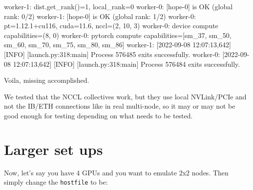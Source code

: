 \documentclass[
]{report}
\newenvironment{Shaded}{\begin{snugshade}}{\end{snugshade}}
\newcommand{\ErrorTok}[1]{\textcolor[rgb]{0.68,0.00,0.00}{#1}}
\newcommand{\ExtensionTok}[1]{\textcolor[rgb]{0.00,0.23,0.31}{#1}}
\newcommand{\KeywordTok}[1]{\textcolor[rgb]{0.00,0.23,0.31}{#1}}
\newcommand{\NormalTok}[1]{\textcolor[rgb]{0.00,0.23,0.31}{#1}}
\newcommand{\PreprocessorTok}[1]{\textcolor[rgb]{0.68,0.00,0.00}{#1}}
\newcommand{\SpecialStringTok}[1]{\textcolor[rgb]{0.13,0.47,0.30}{#1}}
\newcommand{\StringTok}[1]{\textcolor[rgb]{0.13,0.47,0.30}{#1}}
\begin{document}
\begin{Shaded}
\begin{Highlighting}[]
\ExtensionTok{worker{-}1:}\NormalTok{ dist.get\_rank}\ErrorTok{(}\KeywordTok{)}\ExtensionTok{=1,}\NormalTok{ local\_rank=0}
\ExtensionTok{worker{-}0:} \PreprocessorTok{[}\SpecialStringTok{hope}\PreprocessorTok{{-}}\SpecialStringTok{0}\PreprocessorTok{]}\NormalTok{ is OK }\ErrorTok{(}\ExtensionTok{global}\NormalTok{ rank: 0/2}\KeywordTok{)}
\ExtensionTok{worker{-}1:} \PreprocessorTok{[}\SpecialStringTok{hope}\PreprocessorTok{{-}}\SpecialStringTok{0}\PreprocessorTok{]}\NormalTok{ is OK }\ErrorTok{(}\ExtensionTok{global}\NormalTok{ rank: 1/2}\KeywordTok{)}
\ExtensionTok{worker{-}0:}\NormalTok{ pt=1.12.1+cu116, cuda=11.6, nccl=}\ErrorTok{(}\ExtensionTok{2,}\NormalTok{ 10, 3}\KeywordTok{)}
\ExtensionTok{worker{-}0:}\NormalTok{ device compute capabilities=}\ErrorTok{(}\ExtensionTok{8,}\NormalTok{ 0}\KeywordTok{)}
\ExtensionTok{worker{-}0:}\NormalTok{ pytorch compute capabilities=[}\StringTok{\textquotesingle{}sm\_37\textquotesingle{}}\NormalTok{, }\StringTok{\textquotesingle{}sm\_50\textquotesingle{}}\NormalTok{, }\StringTok{\textquotesingle{}sm\_60\textquotesingle{}}\NormalTok{, }\StringTok{\textquotesingle{}sm\_70\textquotesingle{}}\NormalTok{, }\StringTok{\textquotesingle{}sm\_75\textquotesingle{}}\NormalTok{, }\StringTok{\textquotesingle{}sm\_80\textquotesingle{}}\NormalTok{, }\StringTok{\textquotesingle{}sm\_86\textquotesingle{}}\NormalTok{]}
\ExtensionTok{worker{-}1:}\NormalTok{ [2022{-}09{-}08 12:07:13,642] }\PreprocessorTok{[}\SpecialStringTok{INFO}\PreprocessorTok{]} \PreprocessorTok{[}\SpecialStringTok{launch.py:318:main}\PreprocessorTok{]}\NormalTok{ Process 576485 exits successfully.}
\ExtensionTok{worker{-}0:}\NormalTok{ [2022{-}09{-}08 12:07:13,642] }\PreprocessorTok{[}\SpecialStringTok{INFO}\PreprocessorTok{]} \PreprocessorTok{[}\SpecialStringTok{launch.py:318:main}\PreprocessorTok{]}\NormalTok{ Process 576484 exits successfully.}
\end{Highlighting}
\end{Shaded}

Voila, missing accomplished.

We tested that the NCCL collectives work, but they use local NVLink/PCIe
and not the IB/ETH connections like in real multi-node, so it may or may
not be good enough for testing depending on what needs to be tested.

\section{Larger set ups}\label{larger-set-ups}

Now, let's say you have 4 GPUs and you want to emulate 2x2 nodes. Then
simply change the \texttt{hostfile} to be:
\end{document}
